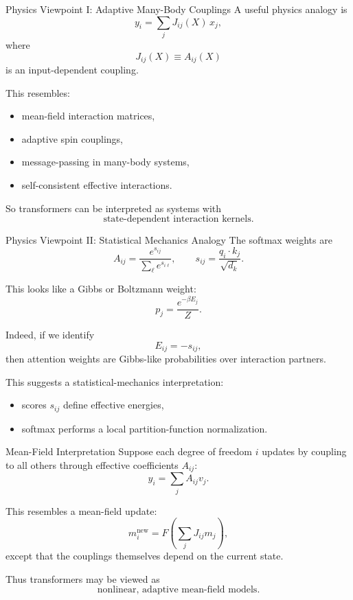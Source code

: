 \documentclass{beamer}
\begin{document}
\begin{frame}{Physics Viewpoint I: Adaptive Many-Body Couplings}
  A useful physics analogy is
  \[
  y_i = \sum_j J_{ij}(X)\, x_j,
  \]
  where
  \[
  J_{ij}(X) \equiv A_{ij}(X)
  \]
  is an input-dependent coupling.

  This resembles:
  \begin{itemize}
  \item mean-field interaction matrices,
  \item adaptive spin couplings,
  \item message-passing in many-body systems,
  \item self-consistent effective interactions.
  \end{itemize}

  So transformers can be interpreted as systems with
  \[
  \text{state-dependent interaction kernels}.
  \]
\end{frame}

\begin{frame}{Physics Viewpoint II: Statistical Mechanics Analogy}
  The softmax weights are
  \[
  A_{ij} =
  \frac{e^{s_{ij}}}{\sum_\ell e^{s_{i\ell}}},
  \qquad
  s_{ij} = \frac{q_i\cdot k_j}{\sqrt{d_k}}.
  \]

  This looks like a Gibbs or Boltzmann weight:
  \[
  p_j = \frac{e^{-\beta E_j}}{Z}.
  \]

  Indeed, if we identify
  \[
  E_{ij} = - s_{ij},
  \]
  then attention weights are Gibbs-like probabilities over interaction partners.

  This suggests a statistical-mechanics interpretation:
  \begin{itemize}
  \item scores \(s_{ij}\) define effective energies,
  \item softmax performs a local partition-function normalization.
  \end{itemize}
\end{frame}

\begin{frame}{Mean-Field Interpretation}
  Suppose each degree of freedom \(i\) updates by coupling to all others through effective coefficients \(A_{ij}\):
  \[
  y_i = \sum_j A_{ij} v_j.
  \]

  This resembles a mean-field update:
  \[
  m_i^{\text{new}} = F\!\left(\sum_j J_{ij} m_j\right),
  \]
  except that the couplings themselves depend on the current state.

  Thus transformers may be viewed as
  \[
  \text{nonlinear, adaptive mean-field models}.
  \]
\end{frame}
\end{document}
